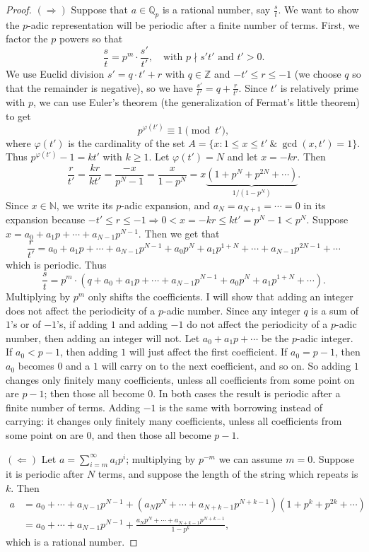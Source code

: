 \documentclass[11pt]{article}
\begin{document}
\begin{proof}
$(\Rightarrow)$ Suppose that $a \in \mathbb{Q}_p$ is a rational number, say $\frac{s}{t}$. We want to show the $p$-adic representation will be periodic after a finite number of terms. First, we factor the $p$ powers so that
\[
\frac{s}{t} = p^m \cdot \frac{s'}{t'}, \quad \text{with } p \nmid s't' \text{ and } t' > 0 .
\]
We use Euclid division $s' = q\cdot t' + r$ with $q \in \mathbb{Z}$ and $-t' \leq r \leq -1$ (we choose $q$ so that the remainder is negative), so we have $\frac{s'}{t'} = q + \frac{r}{t'}$. Since $t'$ is relatively prime with $p$, we can use Euler's theorem (the generalization of Fermat's little theorem) to get
\[
p^{\varphi(t')} \equiv 1 \pmod{t'},
\]
where $\varphi(t')$ is the cardinality of the set $A = \{ x : 1 \leq x \leq t' \ \&\ \gcd(x,t') = 1 \}$. Thus $p^{\varphi(t')} - 1 = kt'$ with $k \geq 1$. Let $\varphi(t') = N$ and let $x = -kr$. Then
\[
\frac{r}{t'} = \frac{kr}{kt'} = \frac{-x}{p^N - 1} = \frac{x}{1 - p^N} = x \underbrace{(1 + p^N + p^{2N} + \cdots)}_{1/(1-p^N)} .
\]
Since $x \in \mathbb{N}$, we write its $p$-adic expansion, and $a_N = a_{N+1} = \cdots = 0$ in its expansion because $-t' \leq r \leq -1 \Rightarrow 0 < x = -kr \leq kt' = p^N - 1 < p^N$. Suppose $x = a_0 + a_1 p + \cdots + a_{N-1} p^{N-1}$. Then we get that
\[
\frac{r}{t'} = a_0 + a_1 p + \cdots + a_{N-1} p^{N-1} + a_0 p^N + a_1 p^{1+N} + \cdots + a_{N-1} p^{2N-1} + \cdots
\]
which is periodic. Thus
\[
\frac{s}{t} = p^m \cdot \left( q + a_0 + a_1 p + \cdots + a_{N-1} p^{N-1} + a_0 p^N + a_1 p^{1+N} + \cdots \right).
\]
Multiplying by $p^m$ only shifts the coefficients. I will show that adding an integer does not affect the periodicity of a $p$-adic number. Since any integer $q$ is a sum of $1$'s or of $-1$'s, if adding $1$ and adding $-1$ do not affect the periodicity of a $p$-adic number, then adding an integer will not. Let $a_0 + a_1 p + \cdots$ be the $p$-adic integer. If $a_0 < p-1$, then adding $1$ will just affect the first coefficient. If $a_0 = p-1$, then $a_0$ becomes $0$ and a $1$ will carry on to the next coefficient, and so on. So adding $1$ changes only finitely many coefficients, unless all coefficients from some point on are $p-1$; then those all become $0$. In both cases the result is periodic after a finite number of terms. Adding $-1$ is the same with borrowing instead of carrying: it changes only finitely many coefficients, unless all coefficients from some point on are $0$, and then those all become $p-1$.

$(\Leftarrow)$ Let $a = \sum_{i=m}^\infty a_i p^i$; multiplying by $p^{-m}$ we can assume $m = 0$. Suppose it is periodic after $N$ terms, and suppose the length of the string which repeats is $k$. Then
\[
\begin{aligned}
a &= a_0 + \cdots + a_{N-1}p^{N-1} + (a_N p^N + \cdots + a_{N+k-1}p^{N+k-1})(1 + p^k + p^{2k} + \cdots) \\
&= a_0 + \cdots + a_{N-1}p^{N-1} + \frac{a_N p^N + \cdots + a_{N+k-1}p^{N+k-1}}{1 - p^k},
\end{aligned}
\]
which is a rational number.
\end{proof}
\end{document}
